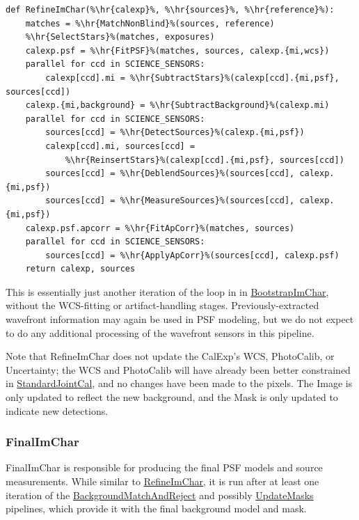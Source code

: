 \begin{lstlisting}
def RefineImChar(%\hr{calexp}%, %\hr{sources}%, %\hr{reference}%):
    matches = %\hr{MatchNonBlind}%(sources, reference)
    %\hr{SelectStars}%(matches, exposures)
    calexp.psf = %\hr{FitPSF}%(matches, sources, calexp.{mi,wcs})
    parallel for ccd in SCIENCE_SENSORS:
        calexp[ccd].mi = %\hr{SubtractStars}%(calexp[ccd].{mi,psf}, sources[ccd])
    calexp.{mi,background} = %\hr{SubtractBackground}%(calexp.mi)
    parallel for ccd in SCIENCE_SENSORS:
        sources[ccd] = %\hr{DetectSources}%(calexp.{mi,psf})
        calexp[ccd].mi, sources[ccd] =
            %\hr{ReinsertStars}%(calexp[ccd].{mi,psf}, sources[ccd])
        sources[ccd] = %\hr{DeblendSources}%(sources[ccd], calexp.{mi,psf})
        sources[ccd] = %\hr{MeasureSources}%(sources[ccd], calexp.{mi,psf})
    calexp.psf.apcorr = %\hr{FitApCorr}%(matches, sources)
    parallel for ccd in SCIENCE_SENSORS:
        sources[ccd] = %\hr{ApplyApCorr}%(sources[ccd], calexp.psf)
    return calexp, sources
\end{lstlisting}

This is essentially just another iteration of the loop in in \hyperref[sec:drpBootstrapImChar]{BootstrapImChar}, without the WCS-fitting or artifact-handling stages.  Previously-extracted wavefront information may again be used in PSF modeling, but we do not expect to do any additional processing of the wavefront sensors in this pipeline.

Note that RefineImChar does not update the CalExp's WCS, PhotoCalib, or Uncertainty; the WCS and PhotoCalib will have already been better constrained in \hyperref[sec:drpStandardJointCal]{StandardJointCal}, and no changes have been made to the pixels.  The Image is only updated to reflect the new background, and the Mask is only updated to indicate new detections.


\let\hr\undefined

\subsubsection{FinalImChar}
\label{sec:drpFinalImChar}

FinalImChar is responsible for producing the final PSF models and source measurements.  While similar to \hyperref[sec:drpRefineImChar]{RefineImChar}, it is run after at least one iteration of the \hyperref[sec:drpBackgroundMatchAndReject]{BackgroundMatchAndReject} and possibly \hyperref[sec:drpUpdateMasks]{UpdateMasks} pipelines, which provide it with the final background model and mask.

